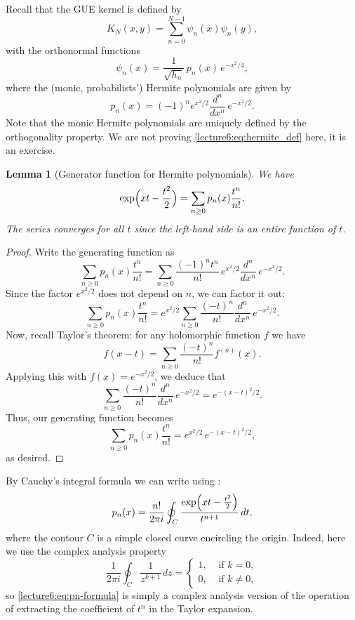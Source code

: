 \documentclass[letterpaper,11pt,oneside,reqno]{book}
\numberwithin{equation}{chapter}  %
\newcommand{\ssp}{\hspace{1pt}}
\newtheorem{lemma}[proposition]{Lemma}
\theoremstyle{definition}
\begin{document}
Recall that the GUE kernel is defined by
\[
K_N(x,y)=\sum_{n=0}^{N-1}\psi_n(x)\psi_n(y),
\]
with the orthonormal functions
\[
\psi_n(x)=\frac{1}{\sqrt{h_n}}\,p_n(x)\,e^{-x^2/4},
\]
where the (monic, probabilists') Hermite polynomials are given by
\begin{equation}
\label{lecture6:eq:hermite_def}
	p_n(x)=(-1)^n e^{x^2/2}\frac{d^n}{dx^n}\,e^{-x^2/2}.
\end{equation}
Note that the monic Hermite polynomials are uniquely defined by the
orthogonality property. We are not proving \eqref{lecture6:eq:hermite_def} here,
it is an exercise.
\begin{lemma}[Generator function for Hermite polynomials]
	\label{lecture6:lem:hermite_gen}
	We have
	\[
		\exp\Bigl(xt-\frac{t^2}{2}\Bigr)=\sum_{n\ge0}p_n(x)\frac{t^n}{n!}.
	\]
	The series converges for all \(t\) since the left-hand side is an entire function of \(t\).
\end{lemma}
\begin{proof}
Write the generating function as
\[
	\sum_{n\ge0}p_n(x)\frac{t^n}{n!}
	=\sum_{n\ge0}\frac{(-1)^n t^n}{n!}\,e^{x^2/2}\frac{d^n}{dx^n}\,e^{-x^2/2}.
\]
Since the factor \(e^{x^2/2}\) does not depend on \(n\), we can factor it out:
\[
	\sum_{n\ge0}p_n(x)\frac{t^n}{n!}= e^{x^2/2}\sum_{n\ge0}\frac{(-t)^n}{n!}\frac{d^n}{dx^n}\,e^{-x^2/2}.
\]
Now, recall Taylor's theorem: for any holomorphic function \(f\) we have
\[
	f(x-t)=\sum_{n\ge0}\frac{(-t)^n}{n!}f^{(n)}(x).
\]
Applying this with \(f(x)=e^{-x^2/2}\), we deduce that
\[
	\sum_{n\ge0}\frac{(-t)^n}{n!}\frac{d^n}{dx^n}\,e^{-x^2/2}= e^{-(x-t)^2/2}.
\]
Thus, our generating function becomes
\[
	\sum_{n\ge0}p_n(x)\frac{t^n}{n!} = e^{x^2/2}\, e^{-(x-t)^2/2},
\]
as desired.
\end{proof}


By Cauchy's integral formula we can write using :
\begin{equation}
\label{lecture6:eq:pn-formula}
p_n(x)=\frac{n!}{2\pi i}\oint_C\frac{\exp\Bigl(xt-\frac{t^2}{2}\Bigr)}{t^{n+1}}\,dt,
\end{equation}
where the contour \(C\) is a simple closed curve encircling the origin.
Indeed, here we use the complex analysis property
\begin{equation*}
	\frac{1}{2\pi i}\oint_C \frac{1}{z^{k+1}}\ssp dz=\begin{cases}
		1,&\text{ if }k=0,\\
		0,&\text{ if }k\neq0,
	\end{cases}
\end{equation*}
so \eqref{lecture6:eq:pn-formula} is simply a complex analysis version of the
operation of extracting the coefficient of \(t^n\) in the Taylor expansion.
\end{document}
